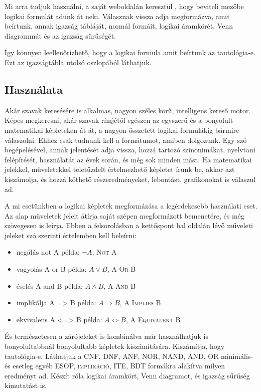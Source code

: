 \documentclass[
]{thesis-ekf}
\theoremstyle{definition}
\theoremstyle{remark}
\begin{document}
	Mi arra tudjuk használni, a saját weboldalán keresztül \cite{link-wolframalpha}, hogy beviteli mezőbe logikai formulát adunk át neki. Válasznak vissza adja megformázva, amit beírtunk, annak igazság tábláját, normál formáit, logikai áramkörét, Venn diagrammát és az igazság sűrűségét.
	
	Így könnyen leellenőrizhető, hogy a logikai formula amit beírtunk az tautológia-e. Ezt az igazságtábla utolsó oszlopából láthatjuk.
	
		\subsection{Használata}\label{kif-wolframalpha-hasznalata}
	Akár szavak keresésére is alkalmas, nagyon széles körű, intelligens kereső motor. Képes megkeresni, akár szavak rímjétől egészen az egyszerű és a bonyolult matematikai képleteken át át, a nagyon összetett logikai formulákig bármire válaszolni. Ehhez csak tudnunk kell a formátumot, amiben dolgozunk. Egy szó begépelésével, annak jelentését adja vissza, hozzá tartozó szinonimákat, nyelvtani felépítését, használatát az évek során, és még sok minden mást. Ha matematikai jelekkel, műveletekkel teletűzdelt értelmezhető képletet írunk be, akkor azt kiszámolja, és hozzá köthető részeredményeket, lebontást, grafikonokat is válaszul ad.
	
	A mi esetünkben a logikai képletek megformázása a legérdekesebb használati eset. Az alap műveletek jeleit átírja saját szépen megformázott bemenetére, és még szövegesen is leírja. Ebben a felsorolásban a kettőspont bal oldalán lévő műveleti jeleket szó szerinti értelemben kell beleírni:
	\begin{itemize}
		\item negálás not A példa: $ \neg A $, \textsc{Not A}
		\item vagyolás A or B példa: $ A\vee B $, \textsc{A Or B}
		\item éselés A and B példa: $ A\wedge B $, \textsc{A And B}
		\item implikálja A => B példa: $ A\Rightarrow B $, \textsc{A Implies B}
		\item ekvivalens A <=> B példa: $ A\Leftrightarrow B  $, \textsc{A Equivalent B}
	\end{itemize}
	És természetesen a zárójeleket is kombinálva már használhatjuk is bonyolultabbnál bonyolultabb képletek kiszámítására. Kiszámítja, hogy tautológia-e. Láthatjuk a \textsc{CNF, DNF, ANF, NOR, NAND, AND, OR} minimális- és esetleg egyéb \textsc{ESOP, implikáció, ITE, BDT} formákra alakítva milyen eredményt ad. Készít róla logikai áramkört, Venn diagramot, és igazság sűrűség kimutatást is.
	
\end{document}
